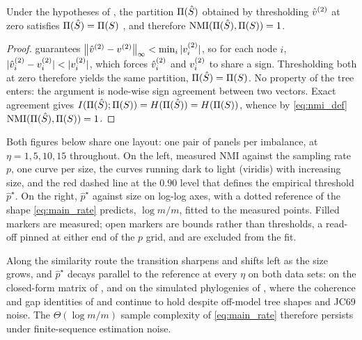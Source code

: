 \begin{corollary}[Perfect partition recovery and $\mathrm{NMI}=1$]\label{cor:nmi}
Under the hypotheses of , the partition $\Pi(\hat S)$ obtained by thresholding $\hat v^{(2)}$ at zero satisfies $\Pi(\hat S)=\Pi(S)$ \hp, and therefore $\mathrm{NMI}(\Pi(\hat S),\Pi(S))=1$.
\end{corollary}
\begin{proof}
 guarantees $\left\lVert \hat v^{(2)}-v^{(2)} \right\rVert_\infty<\min_i|v^{(2)}_i|$, so for each node $i$, $|\vvh_i-\vv_i|<|\vv_i|$, which forces $\hat v^{(2)}_i$ and $v^{(2)}_i$ to share a sign. Thresholding both at zero therefore yields the same partition, $\Pi(\hat S)=\Pi(S)$. No property of the tree enters: the argument is node-wise sign agreement between two vectors. Exact agreement gives $I(\Pi(\hat S);\Pi(S))=H(\Pi(\hat S))=H(\Pi(S))$, whence by \eqref{eq:nmi_def} $\mathrm{NMI}(\Pi(\hat S),\Pi(S))=1$.
\end{proof}

Both figures below share one layout: one pair of panels per imbalance, at $\eta=1,5,10,15$ throughout. On the left, measured NMI against the sampling rate $p$, one curve per size, the curves running dark to light (viridis) with increasing size, and the red dashed line at the $0.90$ level that defines the empirical threshold $\hat p^\star$. On the right, $\hat p^\star$ against size on log-log axes, with a dotted reference of the shape \eqref{eq:main_rate} predicts, $\log m/m$, fitted to the measured points. Filled markers are measured; open markers are bounds rather than thresholds, a read-off pinned at either end of the $p$ grid, and are excluded from the fit.

Along the similarity route the transition sharpens and shifts left as the size grows, and $\hat p^\star$ decays parallel to the reference at every $\eta$ on both data sets: on the closed-form matrix of , and on the simulated phylogenies of , where the coherence and gap identities of  and  continue to hold despite off-model tree shapes and JC69 noise. The $\Theta(\log m/m)$ sample complexity of \eqref{eq:main_rate} therefore persists under finite-sequence estimation noise.

